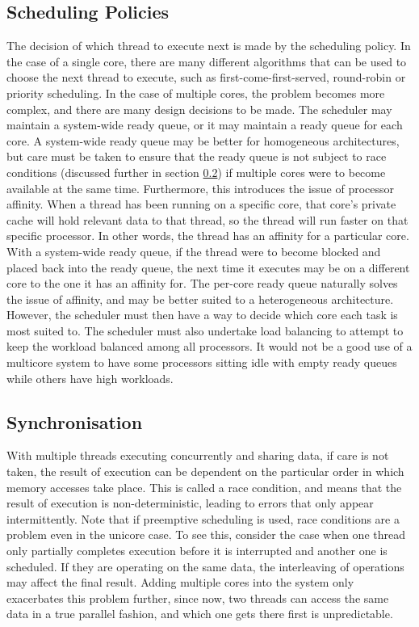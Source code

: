 \documentclass[bsc,frontabs,twoside,singlespacing,parskip,deptreport]{infthesis}     %
\begin{document}
\subsection{Scheduling Policies}
\label{scheduling-challenges}
The decision of which thread to execute next is made by the scheduling policy. In the case of a single core, there are many different algorithms that can be used to choose the next thread to execute, such as first-come-first-served, round-robin or priority scheduling. In the case of multiple cores, the problem becomes more complex, and there are many design decisions to be made. The scheduler may maintain a system-wide ready queue, or it may maintain a ready queue for each core. A system-wide ready queue may be better for homogeneous architectures, but care must be taken to ensure that the ready queue is not subject to race conditions (discussed further in section \ref{synchronisation-challenges}) if multiple cores were to become available at the same time. Furthermore, this introduces the issue of processor affinity. When a thread has been running on a specific core, that core’s private cache will hold relevant data to that thread, so the thread will run faster on that specific processor. In other words, the thread has an affinity for a particular core. With a system-wide ready queue, if the thread were to become blocked and placed back into the ready queue, the next time it executes may be on a different core to the one it has an affinity for. The per-core ready queue naturally solves the issue of affinity, and may be better suited to a heterogeneous architecture. However, the scheduler must then have a way to decide which core each task is most suited to. The scheduler must also undertake load balancing to attempt to keep the workload balanced among all processors. It would not be a good use of a multicore system to have some processors sitting idle with empty ready queues while others have high workloads. 

\subsection{Synchronisation} \label{synchronisation-challenges}
With multiple threads executing concurrently and sharing data, if care is not taken, the result of execution can be dependent on the particular order in which memory accesses take place. This is called a race condition, and means that the result of execution is non-deterministic, leading to errors that only appear intermittently. Note that if preemptive scheduling is used, race conditions are a problem even in the unicore case. To see this, consider the case when one thread only partially completes execution before it is interrupted and another one is scheduled. If they are operating on the same data, the interleaving of operations may affect the final result. Adding multiple cores into the system only exacerbates this problem further, since now, two threads can access the same data in a true parallel fashion, and which one gets there first is unpredictable. 
\end{document}
